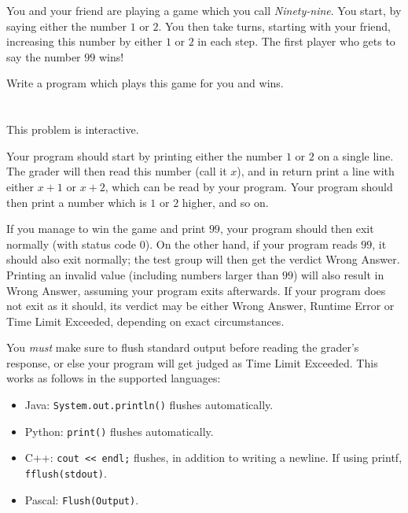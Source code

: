 \ifx\boi\undefined\fi
\def\version{jury-1}

You and your friend are playing a game which you call \emph{Ninety-nine}.
You start, by saying either the number $1$ or $2$.
You then take turns, starting with your friend, increasing this number by either $1$ or $2$ in each step.
The first player who gets to say the number $99$ wins!

Write a program which plays this game for you and wins.

\section*{\interactivity}
This problem is interactive.

Your program should start by printing either the number $1$ or $2$ on a single line.
The grader will then read this number (call it $x$), and in return print a line with either $x+1$ or $x+2$, which can be read by your program.
Your program should then print a number which is $1$ or $2$ higher, and so on.

If you manage to win the game and print $99$, your program should then exit normally (with status code 0).
On the other hand, if your program reads $99$, it should also exit normally; the test group will then get the verdict Wrong Answer.
Printing an invalid value (including numbers larger than $99$) will also result in Wrong Answer, assuming your program exits afterwards.
If your program does not exit as it should, its verdict may be either Wrong Answer, Runtime Error or Time Limit Exceeded, depending on exact circumstances.

You \emph{must} make sure to flush standard output before reading the grader's response, or else your program
will get judged as Time Limit Exceeded. This works as follows in the supported languages:
\begin{itemize}
  \item Java: \texttt{System.out.println()} flushes automatically.
  \item Python: \texttt{print()} flushes automatically.
  \item C++: \texttt{cout << endl;} flushes, in addition to writing a newline. If using printf, \texttt{fflush(stdout)}.
  \item Pascal: \texttt{Flush(Output)}.
\end{itemize}

\section*{\constraints}
\testgroups

